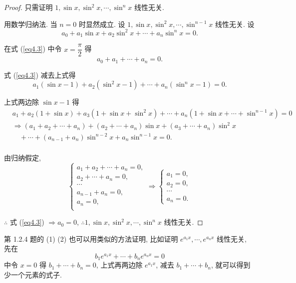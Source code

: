 \documentclass[color=black,device=normal,lang=cn,mode=geye]{elegantnote}
\begin{document}
\begin{proof}
    只需证明 $1,\sin x,\sin^2x,\cdots,\sin^nx$ 线性无关.
    
    用数学归纳法. 当 $n=0$ 时显然成立. 设 $1,\sin x,\sin^2x,\cdots,\sin^{n-1}x$ 线性无关. 设
    \begin{equation}\label{eq4.3}
        a_0+a_1\sin x+a_2\sin^2x+\cdots+a_n\sin^nx=0.
    \end{equation}

    在式 (\ref{eq4.3}) 中令 $x=\dfrac{\pi}{2}$ 得
    \[a_0+a_1+\cdots+a_n=0.\]

    式 (\ref{eq4.3}) 减去上式得
    \[a_1(\sin x-1)+a_2(\sin^2x-1)+\cdots+a_n(\sin^nx-1)=0.\]

    上式两边除 $\sin x-1$ 得
    \begin{align*}
        & a_1+a_2(1+\sin x)+a_3(1+\sin x+\sin^2x)+\cdots+a_n(1+\sin x+\cdots+\sin^{n-1}x)=0 \\
        & \Rightarrow(a_1+a_2+\cdots+a_n)+(a_2+\cdots+a_n)\sin x+(a_3+\cdots+a_n)\sin^2x \\
        & \quad+\cdots+(a_{n-1}+a_n)\sin^{n-2}x+a_n\sin^{n-1}x=0. \\
    \end{align*}

    由归纳假定,
    \[\begin{cases}
        a_1+a_2+\cdots+a_n=0, \\
        a_2+\cdots+a_n=0, \\
        \cdots \\
        a_{n-1}+a_n=0, \\
        a_n=0, \\
    \end{cases}\Rightarrow\begin{cases}
        a_1=0, \\
        a_2=0, \\
        \cdots \\
        a_n=0.
    \end{cases}\]

    $\therefore$ 式 (\ref{eq4.3}) $\Rightarrow a_0=0$, $\therefore1,\sin x,\sin^2x,\cdots,\sin^nx$ 线性无关.
\end{proof}
\begin{note}
    第 1.2.4 题的 (1) (2) 也可以用类似的方法证明, 比如证明 $e^{a_1x},\cdots,e^{a_nx}$ 线性无关, 先在
    \[b_1e^{a_1x}+\cdots+b_ne^{a_nx}=0\]
    中令 $x=0$ 得 $b_1+\cdots+b_n=0$, 上式再两边除 $e^{a_1x}$, 减去 $b_1+\cdots+b_n$, 就可以得到少一个元素的式子.
\end{note}
\end{document}
